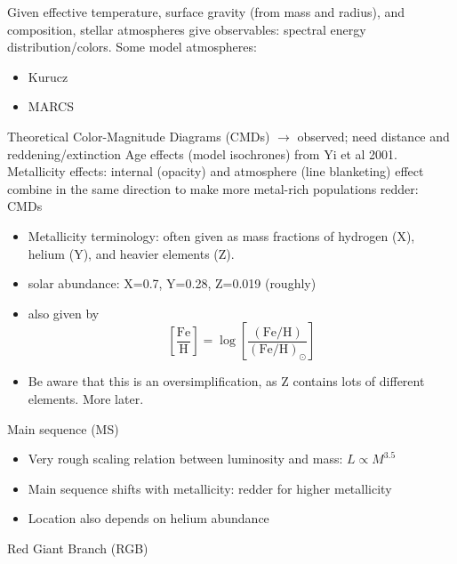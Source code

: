 \documentclass{article}
\begin{document}
Given effective temperature, surface gravity (from mass and radius), and
composition, stellar atmospheres give observables: spectral energy
distribution/colors. Some model atmospheres:
\begin{itemize}
    \item {Kurucz}
    \item {MARCS}
\end{itemize}

Theoretical Color-Magnitude Diagrams (CMDs) $\rightarrow$ observed; need
distance and reddening/extinction Age effects (model isochrones) from Yi et al
2001.  Metallicity effects: internal (opacity) and atmosphere (line blanketing)
effect combine in the same direction to make more metal-rich populations
redder: CMDs
      \begin{itemize}
          \item Metallicity terminology: often given as mass fractions of
              hydrogen (X), helium (Y), and heavier elements (Z).
          \item solar abundance: X=0.7, Y=0.28, Z=0.019 (roughly)
          \item also given by
              $$ \left[\frac{\textrm{Fe}}{\textrm{H}}\right] =
              \log\left[
              \frac{\left( {\textrm{Fe}}/{\textrm{H}} \right)}
              {\left({\textrm{Fe}}/{\textrm{H}}\right)_{\odot}}
              \right]$$
          \item Be aware that this is an oversimplification, as Z contains
              lots of different elements. More later.
      \end{itemize}
    \item Main sequence (MS)
        \begin{itemize}
            \item Very rough scaling relation between luminosity and mass:
                $ L \propto M^{3.5} $
            \item Main sequence shifts with metallicity: redder for
                higher metallicity
            \item Location also depends on helium abundance
        \end{itemize}
    \item Red Giant Branch (RGB)
\end{document}
